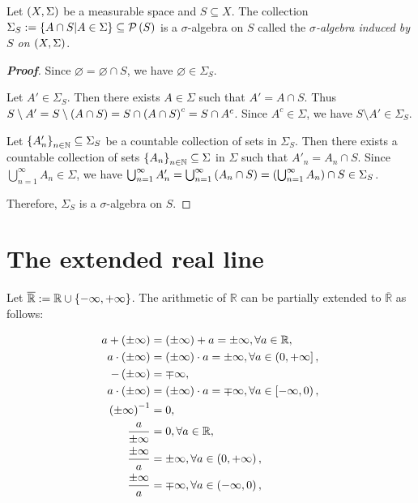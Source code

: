 \begin{proposition}
  Let $\left(X,\Sigma\right)$ be a measurable space and $S\subseteq X$. The collection $\Sigma_S:=\left\{A\cap S\middle|A\in\Sigma\right\}\subseteq\mathcal{P}\left(S\right)$ is a $\sigma$-algebra on $S$ called the \emph{$\sigma$-algebra induced by $S$ on $\left(X,\Sigma\right)$}.
  \begin{proof}[\rm\textbf{Proof}]
    Since $\varnothing=\varnothing\cap S$, we have $\varnothing\in\Sigma_S$. 
    
    Let $A'\in\Sigma_S$. Then there exists $A\in\Sigma$ such that $A'=A\cap S$. Thus $S\setminus A'=S\setminus\left(A\cap S\right)=S\cap\left(A\cap S\right)^c=S\cap A^c$. Since $A^c\in\Sigma$, we have $S\setminus A'\in\Sigma_S$. 
    
    Let $\left\{A'_n\right\}_{n\in\mathbb{N}}\subseteq\Sigma_S$ be a countable collection of sets in $\Sigma_S$. Then there exists a countable collection of sets $\left\{A_n\right\}_{n\in\mathbb{N}}\subseteq\Sigma$ in $\Sigma$ such that $A'_n=A_n\cap S$. Since $\bigcup_{n=1}^{\infty}{A_n}\in\Sigma$, we have $\bigcup_{n=1}^{\infty}{A'_n}=\bigcup_{n=1}^{\infty}{\left(A_n\cap S\right)}=\left(\bigcup_{n=1}^{\infty}{A_n}\right)\cap S\in\Sigma_S$.

    Therefore, $\Sigma_S$ is a $\sigma$-algebra on $S$.
  \end{proof}
\end{proposition}

\section{The extended real line}

Let $\overline{\mathbb{R}}:=\mathbb{R}\cup\left\{-\infty,+\infty\right\}$. The arithmetic of $\mathbb{R}$ can be partially extended to $\overline{\mathbb{R}}$ as follows:

\begin{equation}
  \begin{split}
    a+\left(\pm\infty\right) & = \left(\pm\infty\right)+a=\pm\infty,\forall a\in\mathbb{R},\\
    a\cdot\left(\pm\infty\right) & = \left(\pm\infty\right)\cdot a=\pm\infty,\forall a\in\left(0,+\infty\right],\\
    -\left(\pm\infty\right) & = \mp\infty,\\
    a\cdot\left(\pm\infty\right) & = \left(\pm\infty\right)\cdot a=\mp\infty,\forall a\in\left[-\infty,0\right),\\
    \left(\pm\infty\right)^{-1} & = 0,\\
    \frac{a}{\pm\infty} & = 0,\forall a\in\mathbb{R},\\
    \frac{\pm\infty}{a} & = \pm\infty,\forall a\in\left(0,+\infty\right),\\
    \frac{\pm\infty}{a} & = \mp\infty,\forall a\in\left(-\infty,0\right),\\
  \end{split}
\end{equation}

